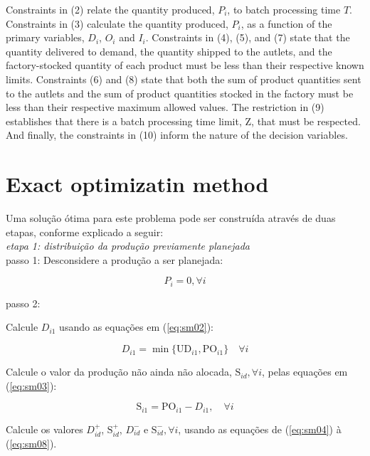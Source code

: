\documentclass[authoryear,preprint,12pt]{elsarticle}
\begin{document}
Constraints in (2) relate the quantity produced, $P_i$, to batch processing time $T$. Constraints in (3) calculate the quantity produced, $P_i$, as a function of the primary variables, $D_i$, $O_i$ and $I_i$. Constraints in (4), (5), and (7) state that the quantity delivered to demand, the quantity shipped to the autlets, and the factory-stocked quantity of each product must be less than their respective known limits. Constraints (6) and (8) state that both the sum of product quantities sent to the autlets and the sum of product quantities stocked in the factory must be less than their respective maximum allowed values. The restriction in (9) establishes that there is a batch processing time limit, $\textrm{Z}$, that must be respected. And finally, the constraints in (10) inform the nature of the decision variables.


\section{Exact optimizatin method}
\label{sec:method}

Uma solução ótima para este problema pode ser construída através de duas etapas, conforme explicado a seguir: \\

\emph{etapa 1: distribuição da produção previamente planejada} \\

passo 1: Desconsidere a produção a ser planejada:

\begin{equation}
\label{eq:sm01}
P_i = 0, \forall i
\end{equation}

passo 2: 

Calcule $D_{i1}$ usando as equações em (\ref{eq:sm02}):

\begin{equation}
\label{eq:sm02}
D_{i1} = \min \{\textrm{UD}_{i1}, \textrm{PO}_{i1}\} \quad \forall i
\end{equation}

Calcule o valor da produção não ainda não alocada, $\textrm{S}_{id}, \forall i$, pelas equações em (\ref{eq:sm03}):

\begin{equation}
\label{eq:sm03}
\textrm{S}_{i1} = \textrm{PO}_{i1} - D_{i1}, \quad \forall i
\end{equation}

Calcule os valores $D_{id}^+$, $\textrm{S}_{id}^+$, $D_{id}^-$ e $\textrm{S}_{id}^-, \forall i$, usando as equações de (\ref{eq:sm04}) à (\ref{eq:sm08}).
\end{document}
